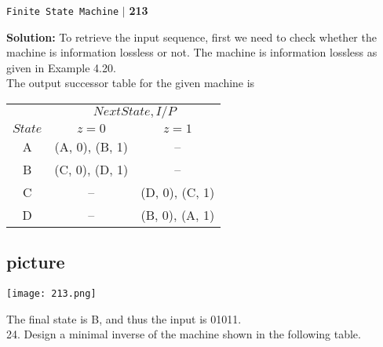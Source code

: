 \documentclass{article}
\begin{document}
\begin{flushright}
 \texttt{Finite State Machine} \hspace*{0.1cm}\textbf{$|$} \hspace*{0.1cm} \textbf{213}\hspace*{0.1cm}
\end{flushright}
\vspace*{0.5cm}

\textbf{Solution:} To retrieve the input sequence, first we need to check whether the machine is information
lossless or not. The machine is information lossless as given in Example 4.20.\\
\hspace*{0.5cm} The output successor table for the given machine is\\


\begin{center}
\begin{tabular}{ccc}
 \hline

 \hline

 \hline

 \hline
 & \multicolumn{2}{c}{$Next State, I/P$}\\
 \cline{2-3}
 $State$ &  $z=0$ & $z=1$\\
\hline
A   & (A, 0), (B, 1) &   –          \\
B   & (C, 0), (D, 1) &   –          \\
C   &  –             &(D, 0), (C, 1)\\
D   &  –             &(B, 0), (A, 1)\\
 \hline

 \hline

 \hline

 \hline
\end{tabular}
\end{center}

\begin{center}
\section{picture}
\texttt{[image: 213.png]}
\end{center}

\hspace*{0.5cm} The final state is B, and thus the input is 01011.\\

24. Design a minimal inverse of the machine shown in the following table.\\
\begin{flushright}
  [WBUT 2007, 2008]\\
\end{flushright}
\end{document}
